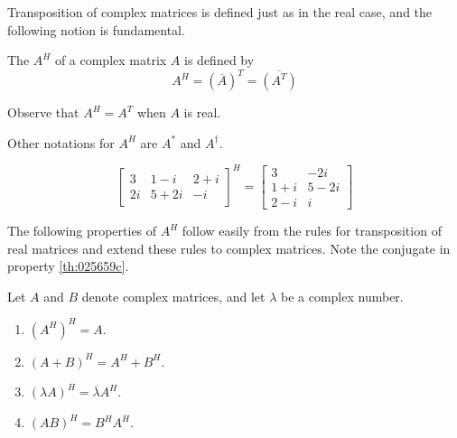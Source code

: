 \documentclass{ximera}
\begin{document}
Transposition of complex matrices is defined just as in the real case, and the following notion is fundamental.


\begin{definition}\label{dfn:conjtrans}
The  $A^{H}$ of a complex matrix $A$ is defined by
\begin{equation*}
A^H = (\overline{A})^T = \overline{(A^T)}
\end{equation*}
\end{definition}

Observe that $A^{H} = A^{T}$ when $A$ is real.
\begin{remark}
    Other notations for $A^{H}$ are $A^\ast$ and $A^\dagger$.
\end{remark}

\begin{example}\label{ex:025654}
\begin{equation*}
\left[ \begin{array}{ccr}
3 & 1 - i & 2 + i \\
2i & 5 + 2i & -i
\end{array}\right]^H = \left[ \begin{array}{cc}
3 & -2i \\
1 + i & 5 - 2i \\
2 - i & i
\end{array}\right]
\end{equation*}
\end{example}

The following properties of $A^{H}$ follow easily from the rules for transposition of real matrices and extend these rules to complex matrices. Note the conjugate in property \ref{th:025659c}.


\begin{theorem}\label{th:025659}
Let $A$ and $B$ denote complex matrices, and let $\lambda$ be a complex number.

\begin{enumerate}
\item\label{th:025659a} $(A^{H})^{H} = A$.

\item\label{th:025659b} $(A + B)^{H} = A^{H} + B^{H}$.

\item\label{th:025659c} $(\lambda A)^H = \overline{\lambda}A^H$.

\item\label{th:025659d} $(AB)^{H} = B^{H}A^{H}$.

\end{enumerate}
\end{theorem}
\end{document}
